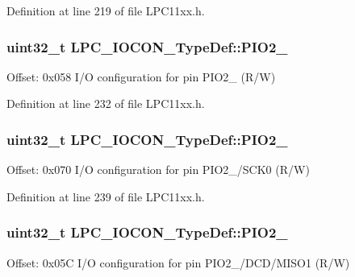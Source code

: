 Definition at line 219 of file L\+P\+C11xx.\+h.

\subsubsection[{\texorpdfstring{P\+I\+O2\+\_\+10}{PIO2_10}}]{ uint32\+\_\+t L\+P\+C\+\_\+\+I\+O\+C\+O\+N\+\_\+\+Type\+Def\+::\+P\+I\+O2\+\_}\hypertarget{group___l_p_c11xx___definitions_ga841de055f1f1ac93749884241ebd4274}{}\label{group___l_p_c11xx___definitions_ga841de055f1f1ac93749884241ebd4274}
Offset\+: 0x058 I/O configuration for pin P\+I\+O2\+\_ (R/W) 

Definition at line 232 of file L\+P\+C11xx.\+h.

\subsubsection[{\texorpdfstring{P\+I\+O2\+\_\+11}{PIO2_11}}]{ uint32\+\_\+t L\+P\+C\+\_\+\+I\+O\+C\+O\+N\+\_\+\+Type\+Def\+::\+P\+I\+O2\+\_}\hypertarget{group___l_p_c11xx___definitions_gad384ab0e4ae297786b37d2c3a874508f}{}\label{group___l_p_c11xx___definitions_gad384ab0e4ae297786b37d2c3a874508f}
Offset\+: 0x070 I/O configuration for pin P\+I\+O2\+\_/\+S\+C\+K0 (R/W) 

Definition at line 239 of file L\+P\+C11xx.\+h.

\subsubsection[{\texorpdfstring{P\+I\+O2\+\_\+2}{PIO2_2}}]{ uint32\+\_\+t L\+P\+C\+\_\+\+I\+O\+C\+O\+N\+\_\+\+Type\+Def\+::\+P\+I\+O2\+\_}\hypertarget{group___l_p_c11xx___definitions_gad8ad85518fffd1c1786fdc6940c108e5}{}\label{group___l_p_c11xx___definitions_gad8ad85518fffd1c1786fdc6940c108e5}
Offset\+: 0x05C I/O configuration for pin P\+I\+O2\+\_/\+D\+C\+D/\+M\+I\+S\+O1 (R/W) 

